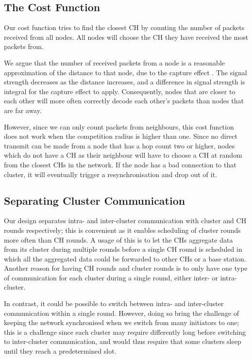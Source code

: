 \subsection{The Cost Function}
\begin{newtext}
Our cost function tries to find the closest CH by counting the number of packets received from all nodes. All nodes will choose the CH they have received the most packets from. 

We argue that the number of received packets from a node is a reasonable approximation of the distance to that node, due to the capture effect \cite{Lee2007-capture-effect}. The signal strength decreases as the distance increases, and a difference in signal strength is integral for the capture effect to apply. Consequently, nodes that are closer to each other will more often correctly decode each other's packets than nodes that are far away.

However, since we can only count packets from neighbours, this cost function does not work when the competition radius is higher than one. Since no direct transmit can be made from a node that has a hop count two or higher, nodes which do not have a CH as their neighbour will have to choose a CH at random from the closest CHs in the network. If the node has a bad connection to that cluster, it will eventually trigger a resynchronisation and drop out of it.
\end{newtext}

\subsection{Separating Cluster Communication}
\begin{newtext}
Our design separates intra- and inter-cluster communication with cluster and CH rounds respectively; this is convenient as it enables scheduling of cluster rounds more often than CH rounds. A usage of this is to let the CHs aggregate data from its cluster during multiple rounds before a single CH round is scheduled in which all the aggregated data could be forwarded to other CHs or a base station. Another reason for having CH rounds and cluster rounds is to only have one type of communication for each cluster during a single round, either inter- or intra-cluster.

In contrast, it could be possible to switch between intra- and inter-cluster communication within a single round. However, doing so bring the challenge of keeping the network synchronised when we switch from many initiators to one; this is a challenge since each cluster may require differently long before switching to inter-cluster communication, and would thus require that some clusters sleep until they reach a predetermined slot.
\end{newtext}